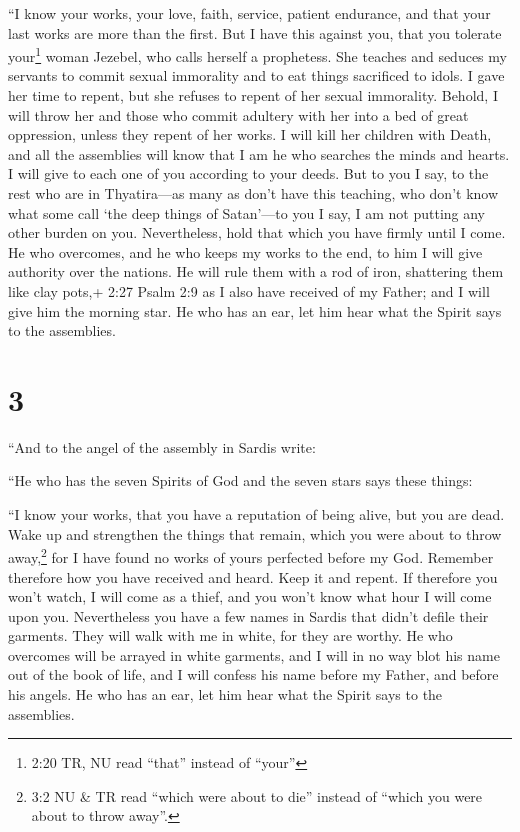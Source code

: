  ``I know your works, your love, faith, service, patient
endurance, and that your last works are more than the first.
 But I have this against you, that you tolerate
your\footnote{2:20 TR, NU read ``that'' instead of ``your''} woman
Jezebel, who calls herself a prophetess. She teaches and seduces my
servants to commit sexual immorality and to eat things sacrificed to
idols.  I gave her time to repent, but she refuses to
repent of her sexual immorality.  Behold, I will throw her
and those who commit adultery with her into a bed of great oppression,
unless they repent of her works.  I will kill her children
with Death, and all the assemblies will know that I am he who searches
the minds and hearts. I will give to each one of you according to your
deeds.  But to you I say, to the rest who are in
Thyatira---as many as don't have this teaching, who don't know what some
call `the deep things of Satan'---to you I say, I am not putting any
other burden on you.  Nevertheless, hold that which you
have firmly until I come.  He who overcomes, and he who
keeps my works to the end, to him I will give authority over the
nations.  He will rule them with a rod of iron, shattering
them like clay pots,+ 2:27 Psalm 2:9 as I also have received of my
Father;  and I will give him the morning star.
 He who has an ear, let him hear what the Spirit says to
the assemblies.

\hypertarget{section-2}{%
\section{3}\label{section-2}}

 ``And to the angel of the assembly in Sardis write:

``He who has the seven Spirits of God and the seven stars says these
things:

``I know your works, that you have a reputation of being alive, but you
are dead.  Wake up and strengthen the things that remain,
which you were about to throw away,\footnote{3:2 NU \& TR read ``which
  were about to die'' instead of ``which you were about to throw away''.}
for I have found no works of yours perfected before my God. 
Remember therefore how you have received and heard. Keep it and repent.
If therefore you won't watch, I will come as a thief, and you won't know
what hour I will come upon you.  Nevertheless you have a few
names in Sardis that didn't defile their garments. They will walk with
me in white, for they are worthy.  He who overcomes will be
arrayed in white garments, and I will in no way blot his name out of the
book of life, and I will confess his name before my Father, and before
his angels.  He who has an ear, let him hear what the Spirit
says to the assemblies.

